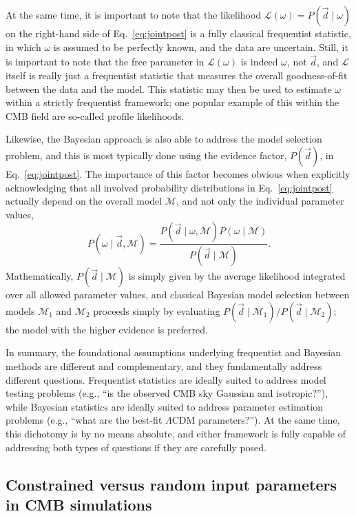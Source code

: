 \documentclass[twocolumn]{aa}%
\renewcommand{\d}[0]{\vec{d}}
\begin{document}
At the same time, it is important to note that the likelihood
$\mathcal{L}(\omega) = P(\d\mid\omega)$ on the right-hand side of
Eq.~\eqref{eq:jointpost} is a fully classical frequentist statistic,
in which $\omega$ is assumed to be perfectly known, and the data are
uncertain. Still, it is important to note that the free parameter in
$\mathcal{L}(\omega)$ is indeed $\omega$, not $\d$, and $\mathcal{L}$
itself is really just a frequentist statistic that measures the
overall goodness-of-fit between the data and the model. This statistic
may then be used to estimate $\omega$ within a strictly frequentist
framework; one popular example of this within the CMB field are
so-called profile likelihoods. 

Likewise, the Bayesian approach is also able to address the model
selection problem, and this is most typically done using the evidence
factor, $P(\d)$, in Eq.~\ref{eq:jointpost}. The importance of this
factor becomes obvious when explicitly acknowledging that all involved
probability distributions in Eq.~\eqref{eq:jointpost} actually depend
on the overall model $\mathcal{M}$, and not only the individual
parameter values,
\begin{equation}
  P(\omega\mid \d, \mathcal{M}) = \frac{P(\d\mid \omega, \mathcal{M})P(\omega\mid\mathcal{M})}{P(\d\mid\mathcal{M})} 
  \label{eq:bayes}.
\end{equation}
Mathematically, $P(\d\mid\mathcal{M})$ is simply given by the average
likelihood integrated over all allowed parameter values, and classical
Bayesian model selection between models $\mathcal{M}_1$ and
$\mathcal{M}_2$ proceeds simply by evaluating
$P(\d\mid\mathcal{M}_1)/P(\d\mid\mathcal{M}_2)$; the model with the higher
evidence is preferred.

In summary, the foundational assumptions underlying frequentist and
Bayesian methods are different and complementary, and they
fundamentally address different questions. Frequentist statistics are
ideally suited to address model testing problems (e.g., ``is the
observed CMB sky Gaussian and isotropic?''), while Bayesian statistics
are ideally suited to address parameter estimation problems (e.g.,
``what are the best-fit $\Lambda$CDM parameters?''). At the same time,
this dichotomy is by no means absolute, and either framework is fully
capable of addressing both types of questions if they are carefully posed.

\subsection{Constrained versus random input parameters in CMB simulations}
\end{document}
